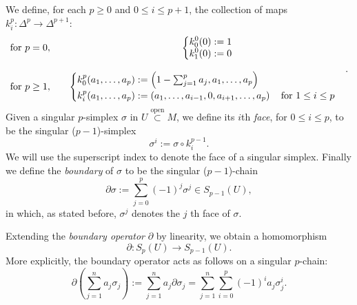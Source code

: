 \begin{defn}[Boundary]
	We define, for each $p \geq 0$ and $0 \leq i \leq p+1$, the collection of maps $k_i^p: \Delta^p \to \Delta^{p+1}$:
	\begin{align}
	\begin{matrix}
		\text{for } p = 0,\quad 
		&\begin{dcases}
			k^0_0(0) := 1\\
			k^0_1(0) := 0\\
		\end{dcases} \\
		\\
		\text{for } p \geq 1,\quad 
		&\begin{cases}
		k_0^p(a_1, \ldots, a_p) := \left( 1 - \sum_{j=1}^{p} a_j, a_1, \ldots, a_p \right)\\
		k_i^p(a_1, \ldots, a_p) := \left( a_1, \ldots, a_{i-1}, 0, a_{i+1}, \ldots, a_p \right) \quad \text{for } 1 \leq i \leq p
	\end{cases} 
	\end{matrix} 
	.\end{align} 
	Given a singular $p$-simplex $\sigma$ in $U \stackrel{\text{open}}{\subset} M$, we define its $i$th \textit{face}, for $0 \leq i \leq p$, to be the singular ($p-1$)-simplex
	\begin{equation}
		\sigma^i := \sigma \circ k_i^{p-1} 
	.\end{equation}
	We will use the superscript index to denote the face of a singular simplex.
	Finally we define the \textit{boundary} of $\sigma$ to be the singular ($p-1$)-chain
	\begin{equation}
		\partial \sigma := \sum_{j=0}^{p} (-1)^j \sigma^j \in S_{p-1}(U)
	,\end{equation} 
	in which, as stated before, $\sigma^j$ denotes the $j$ th face of $\sigma$.

	Extending the \textit{boundary operator} $\partial$ by linearity, we obtain a homomorphism
	\begin{equation}
		\partial: S_p(U) \to S_{p-1}(U)
	.\end{equation} 
	More explicitly, the boundary operator acts as follows on a singular $p$-chain:
	\begin{equation}
		\partial \left( \sum_{j=1}^{n} a_j \sigma_j \right) := \sum_{j=1}^{n} a_j \partial \sigma_j = \sum_{j=1}^{n} \sum_{i=0}^{p} (-1)^i a_j \sigma_j^i
	.\end{equation} 
\end{defn}

